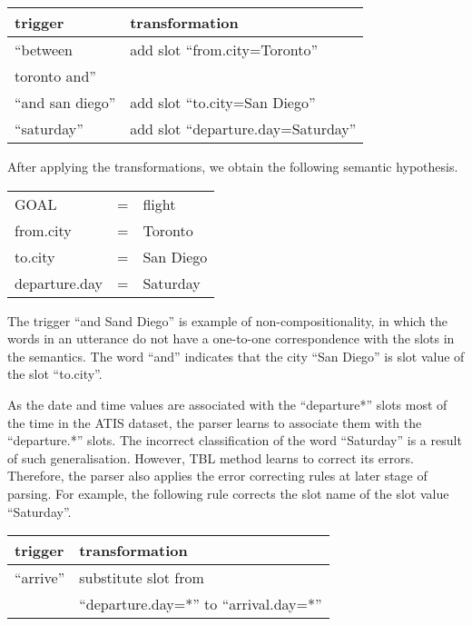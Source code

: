 \documentclass{article}
\begin{document}
\vspace{.15cm}
\begin{tabular}{ll}
  trigger & transformation \\
  \hline 
  ``between               & add slot ``from.city=Toronto'' \\
    toronto and''         &  \\
  ``and san diego''       & add slot ``to.city=San Diego'' \\
  ``saturday''            & add slot ``departure.day=Saturday'' \\
\end{tabular} 
\vspace{.15cm}

After applying the transformations, we obtain the following semantic hypothesis. 

\vspace{.15cm}
\begin{tabular}{lll}
  GOAL          & = & flight \\
  from.city     & = & Toronto \\
  to.city       & = & San Diego \\
  departure.day & = & Saturday \\
\end{tabular} 
\vspace{.15cm}

The trigger ``and Sand Diego'' is example of non-compositionality, in which the words in an utterance do not have a one-to-one correspondence with the slots in the semantics. The word ``and'' indicates that the city ``San Diego'' is slot value of the slot ``to.city''. 


As the date and time values are associated with the ``departure*'' slots most of the time in the ATIS dataset,  
the parser learns to associate them with the ``departure.*'' slots. The incorrect classification of the word ``Saturday'' is a result of such generalisation. 
However, TBL method learns to correct its errors. Therefore, the parser also applies the error correcting rules at later stage of parsing. For example, the following rule corrects the slot name of the slot value ``Saturday''.

\vspace{.15cm}
\begin{tabular}{ll}
  trigger & transformation \\
  \hline 
  ``arrive''            & substitute slot from\\
                        & ``departure.day=*'' to ``arrival.day=*'' \\
\end{tabular} 
\vspace{.15cm}
\end{document}

